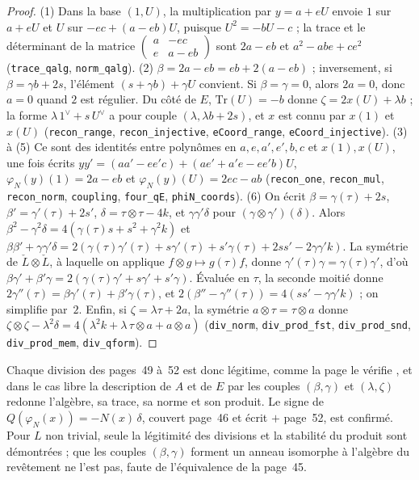 \begin{proof}
(1) Dans la base $(1, U)$, la multiplication par $y = a + eU$ envoie $1$ sur $a + eU$ et $U$ sur $-ec + (a - eb)U$, puisque $U^2 = -bU - c$ ; la trace et le déterminant de la matrice $\begin{pmatrix} a & -ec \\ e & a - eb \end{pmatrix}$ sont $2a - eb$ et $a^2 - abe + ce^2$ (\texttt{trace\_qalg}, \texttt{norm\_qalg}). (2) $\beta = 2a - eb = eb + 2(a - eb)$ ; inversement, si $\beta = \gamma b + 2s$, l'élément $(s + \gamma b) + \gamma U$ convient. Si $\beta = \gamma = 0$, alors $2a = 0$, donc $a = 0$ quand $2$ est régulier. Du côté de $E$, $\mathrm{Tr}(U) = -b$ donne $\zeta = 2x(U) + \lambda b$ ; la forme $\lambda\,1^\vee + s\,U^\vee$ a pour couple $(\lambda, \lambda b + 2s)$, et $x$ est connu par $x(1)$ et $x(U)$ (\texttt{recon\_range}, \texttt{recon\_injective}, \texttt{eCoord\_range}, \texttt{eCoord\_injective}). (3) à (5) Ce sont des identités entre polynômes en $a, e, a', e', b, c$ et $x(1), x(U)$, une fois écrits $yy' = (aa' - ee'c) + (ae' + a'e - ee'b)U$, $\varphi_N(y)(1) = 2a - eb$ et $\varphi_N(y)(U) = 2ec - ab$ (\texttt{recon\_one}, \texttt{recon\_mul}, \texttt{recon\_norm}, \texttt{coupling}, \texttt{four\_qE}, \texttt{phiN\_coords}). (6) On écrit $\beta = \gamma(\tau) + 2s$, $\beta' = \gamma'(\tau) + 2s'$, $\delta = \tau \otimes \tau - 4k$, et $\gamma\gamma'\delta$ pour $(\gamma \otimes \gamma')(\delta)$. Alors $\beta^2 - \gamma^2\delta = 4(\gamma(\tau)s + s^2 + \gamma^2k)$ et $\beta\beta' + \gamma\gamma'\delta = 2(\gamma(\tau)\gamma'(\tau) + s\gamma'(\tau) + s'\gamma(\tau) + 2ss' - 2\gamma\gamma'k)$. La symétrie de $\check L \otimes \check L$, à laquelle on applique $f \otimes g \mapsto g(\tau)f$, donne $\gamma'(\tau)\gamma = \gamma(\tau)\gamma'$, d'où $\beta\gamma' + \beta'\gamma = 2(\gamma(\tau)\gamma' + s\gamma' + s'\gamma)$. Évaluée en $\tau$, la seconde moitié donne $2\gamma''(\tau) = \beta\gamma'(\tau) + \beta'\gamma(\tau)$, et $2(\beta'' - \gamma''(\tau)) = 4(ss' - \gamma\gamma'k)$ ; on simplifie par~$2$. Enfin, si $\zeta = \lambda\tau + 2a$, la symétrie $a \otimes \tau = \tau \otimes a$ donne $\zeta \otimes \zeta - \lambda^2\delta = 4(\lambda^2k + \lambda\,\tau \otimes a + a \otimes a)$ (\texttt{div\_norm}, \texttt{div\_prod\_fst}, \texttt{div\_prod\_snd}, \texttt{div\_prod\_mem}, \texttt{div\_qform}).
\end{proof}

\begin{remarque}
Chaque division des pages~49 à~52 est donc légitime, comme la page le vérifie , et dans le cas libre la description de $A$ et de $E$ par les couples $(\beta, \gamma)$ et $(\lambda, \zeta)$ redonne l'algèbre, sa trace, sa norme et son produit. Le signe de $Q(\varphi_N(x)) = -N(x)\,\delta$, couvert page~46 et écrit $+$ page~52, est confirmé. Pour $L$ non trivial, seule la légitimité des divisions et la stabilité du produit sont démontrées ; que les couples $(\beta, \gamma)$ forment un anneau isomorphe à l'algèbre du revêtement ne l'est pas, faute de l'équivalence de la page~45.
\end{remarque}


